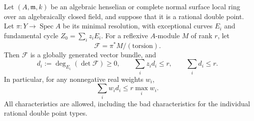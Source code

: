 \begin{proposition}
\label{D:RDP-full-sheaf-degree}
Let $(A,\mathfrak m,k)$ be an algebraic henselian or complete normal
surface local ring over an algebraically closed field, and suppose that
it is a rational double point. Let $\pi:Y\to\operatorname{Spec}A$ be
its minimal resolution, with exceptional curves $E_i$ and fundamental
cycle $Z_0=\sum_i z_iE_i$. For a reflexive $A$-module $M$ of rank $r$,
let
\[
 \mathcal F=\pi^*M/(\text{torsion}).
\]
Then $\mathcal F$ is a globally generated vector bundle, and
\[
 d_i:=\deg_{E_i}(\det\mathcal F)\ge0,\qquad
 \sum_i z_i d_i\le r,\qquad \sum_i d_i\le r.             \tag{D.FS.1}
\]
In particular, for any nonnegative real weights $w_i$,
\[
 \sum_i w_i d_i\le r\max_i w_i.                          \tag{D.FS.2}
\]
All characteristics are allowed, including the bad characteristics for
the individual rational double point types.
\end{proposition}

